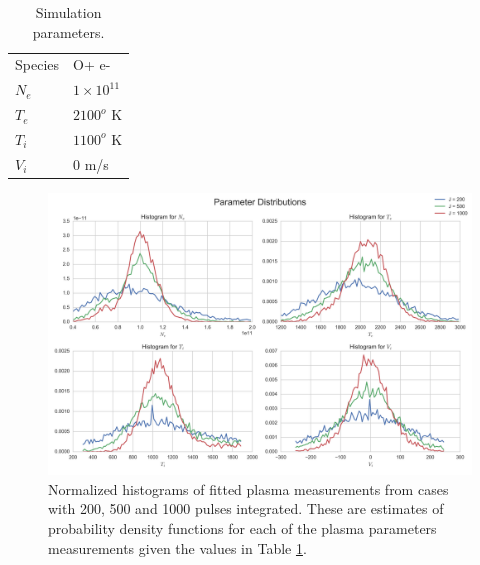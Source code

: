 \documentclass[draft,ras]{agutex}
\begin{document}
\begin{article}
\begin{table}[!t]
\centering
\caption{Simulation parameters.}
\label{tb:param1}
\begin{tabular}{ll}
Species & O+ e-\\
$N_e$    & $1\times 10^{11}$ \\
$T_e$      & $2100^o$ K   \\
$T_i$      & $1100^o$ K \\
$V_i$      & $0$ m/s
\end{tabular}
\end{table}

\begin{figure}[!t]
\centering
\includegraphics[width=5in]{datahist}
\caption{Normalized histograms of fitted plasma measurements from cases with 200, 500 and 1000 pulses integrated. These are estimates of probability density functions for each of the plasma parameters measurements given the values in Table \ref{tb:param1}.}
\label{fig:statshistall}
\end{figure}


\end{article}
\end{document}
